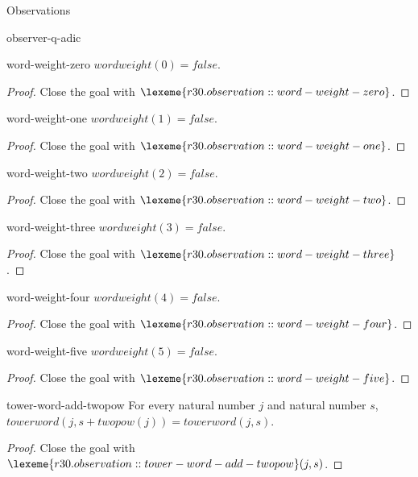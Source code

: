 \begin{lexlean}{Observations}
\begin{section}{observer-q-adic}
\begin{theorem}{word-weight-zero}
\(wordweight(0) = false\).
\begin{proof}
Close the goal with \(\lexeme{r30.observation::word-weight-zero}\).
\end{proof}
\end{theorem}

\begin{theorem}{word-weight-one}
\(wordweight(1) = false\).
\begin{proof}
Close the goal with \(\lexeme{r30.observation::word-weight-one}\).
\end{proof}
\end{theorem}

\begin{theorem}{word-weight-two}
\(wordweight(2) = false\).
\begin{proof}
Close the goal with \(\lexeme{r30.observation::word-weight-two}\).
\end{proof}
\end{theorem}

\begin{theorem}{word-weight-three}
\(wordweight(3) = false\).
\begin{proof}
Close the goal with \(\lexeme{r30.observation::word-weight-three}\).
\end{proof}
\end{theorem}

\begin{theorem}{word-weight-four}
\(wordweight(4) = false\).
\begin{proof}
Close the goal with \(\lexeme{r30.observation::word-weight-four}\).
\end{proof}
\end{theorem}

\begin{theorem}{word-weight-five}
\(wordweight(5) = false\).
\begin{proof}
Close the goal with \(\lexeme{r30.observation::word-weight-five}\).
\end{proof}
\end{theorem}

\begin{theorem}{tower-word-add-twopow}
For every natural number \(j\) and natural number \(s\), \(towerword(j, s + twopow(j)) = towerword(j, s)\).
\begin{proof}
Close the goal with \(\lexeme{r30.observation::tower-word-add-twopow}(j, s)\).
\end{proof}
\end{theorem}


\end{section}
\end{lexlean}
